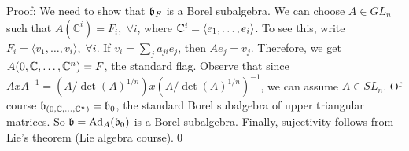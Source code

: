 Proof: We need to show that $\mathfrak{b}_F$ is a Borel subalgebra. We can choose $A\in GL_n$ such 
that $A(\mathbb{C}^i)=F_i,\;\forall i$, where $\mathbb{C}^i = \langle e_1,\dots, e_i\rangle$. To see this, write 
$F_i = \langle v_1,\dots, v_i\rangle,\;\forall i$. If $v_i = \sum_j a_{ji}e_j$, then $Ae_j=v_j$. 
Therefore, we get $A(0,\mathbb{C},\dots,\mathbb{C}^n)=F$, the standard flag. Observe that since $AxA^{-1}=(A/\det(A)^{1/n})x(A/\det(A)^{1/n})^{-1}$, we 
can assume $A\in SL_n$. Of course $\mathfrak{b}_{(0,\mathbb{C},\dots,\mathbb{C}^n )}=\mathfrak{b}_0$, the standard Borel subalgebra of upper triangular matrices. 
So $\mathfrak{b}=\text{Ad}_A(\mathfrak{b}_0)$ is a Borel subalgebra. Finally, sujectivity follows from Lie's theorem (Lie algebra course).\qed
